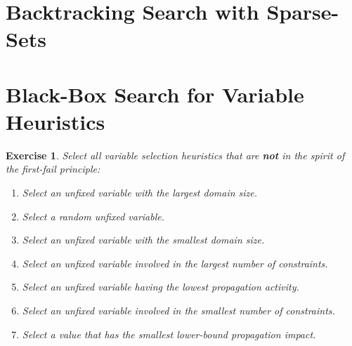 \documentclass{article}
\newtheorem{exercise}{Exercise}[section]
\begin{document}
    \begin{minipage}{\linewidth}
        
    \end{minipage}

    \begin{minipage}{\linewidth}
        
    \end{minipage}


    \section{Backtracking Search with Sparse-Sets}



    \section{Black-Box Search for Variable Heuristics}



    \begin{exercise}
        Select all variable selection heuristics that are \textbf{not} in the spirit of the first-fail principle:
        \begin{enumerate}
            \item Select an unfixed variable with the largest domain size.
            \item Select a random unfixed variable.
            \item Select an unfixed variable with the smallest domain size.
            \item Select an unfixed variable involved in the largest number of constraints.
            \item Select an unfixed variable having the lowest propagation activity.
            \item Select an unfixed variable involved in the smallest number of constraints.
            \item Select a value that has the smallest lower-bound propagation impact.
        \end{enumerate}
        \label{ex:variable_heuristics}
    \end{exercise}
\end{document}
